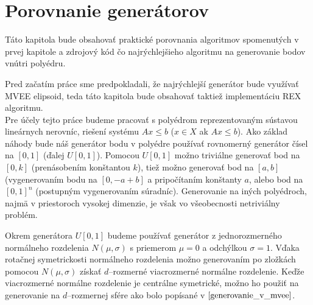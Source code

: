 \chapter{Porovnanie generátorov}

Táto kapitola bude obsahovať praktické porovnania algoritmov spomenutých v prvej kapitole a zdrojový kód čo najrýchlejšieho algoritmu na generovanie bodov vnútri polyédru.

Pred začatím práce sme predpokladali, že najrýchlejší generátor bude využívať MVEE elipsoid, teda táto kapitola bude obsahovať taktiež implementáciu REX algoritmu.\\

Pre účely tejto práce budeme pracovať s polyédrom reprezentovaným sústavou lineárnych nerovníc, riešení systému $Ax \leq b$ ($x \in X$ ak $Ax \leq b$).
Ako základ náhody bude náš generátor bodu v polyédre používať rovnomerný generátor čísel na $[0,1]$ (ďalej $U[0,1]$). Pomocou $U[0,1]$ možno triviálne generovať bod na $[0,k]$ (prenásobením konštantou $k$), tiež možno generovať bod na $[a,b]$ (vygenerovaním bodu na $[0, -a+b]$ a pripočítaním konštanty $a$, alebo bod na $[0,1]^n$ (postupným vygenerovaním súradníc). Generovanie na iných polyédroch, najmä v priestoroch vysokej dimenzie, je však vo všeobecnosti netriviálny problém.

Okrem generátora $U[0,1]$ budeme používať generátor z jednorozmerného normálneho rozdelenia $N(\mu, \sigma)$ s priemerom $\mu=0$ a odchýlkou $\sigma=1$. Vďaka rotačnej symetrickosti normálneho rozdelenia možno generovaním po zložkách pomocou $N(\mu, \sigma)$ získať $d$--rozmerné viacrozmerné normálne rozdelenie.
Keďže viacrozmerné normálne rozdelenie je centrálne symetrické, možno ho použiť na generovanie na $d$--rozmernej sfére ako bolo popísané v $\ref{generovanie_v_mvee}$.
